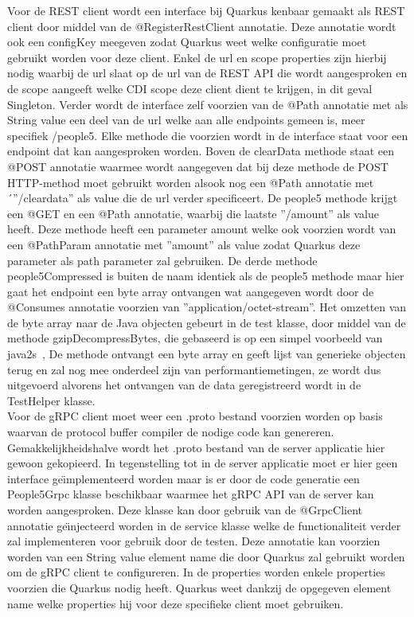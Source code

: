 Voor de REST client wordt een interface bij Quarkus kenbaar gemaakt als REST client door middel van de @RegisterRestClient annotatie. Deze annotatie wordt ook een configKey meegeven
zodat Quarkus weet welke configuratie moet gebruikt worden voor deze client.  Enkel de url en scope properties zijn hierbij nodig waarbij de url slaat op de url van de
REST API die wordt aangesproken en de scope aangeeft welke CDI scope deze client dient te krijgen, in dit geval Singleton.
Verder wordt de interface zelf voorzien van de @Path annotatie met als String value een deel van de url welke
aan alle endpoints gemeen is, meer specifiek /people5. Elke methode die voorzien wordt in de interface staat voor een endpoint dat kan aangesproken worden.
Boven de clearData methode staat een @POST annotatie waarmee wordt aangegeven dat bij deze methode de POST HTTP-method moet gebruikt worden alsook
nog een @Path annotatie met ´''/cleardata'' als value die de url verder specificeert. De people5 methode krijgt een @GET en een @Path annotatie, waarbij die laatste ''/{amount}''
als value heeft. Deze methode heeft een parameter amount welke ook voorzien wordt van een @PathParam annotatie met ''amount'' als value zodat Quarkus
deze parameter als path parameter zal gebruiken. De derde methode people5Compressed is buiten de naam identiek als de people5 methode maar hier gaat het endpoint een
byte array ontvangen wat aangegeven wordt door de @Consumes annotatie voorzien van ''application/octet-stream''. Het omzetten van de byte array naar de Java objecten gebeurt
in de test klasse, door middel van de methode gzipDecompressBytes, die gebaseerd is op een simpel voorbeeld van java2s~\parencite{gzipDecompressie},
De methode ontvangt een byte array en geeft lijst van generieke objecten terug en zal nog mee onderdeel zijn van performantiemetingen,
ze wordt dus uitgevoerd alvorens het ontvangen van de data geregistreerd wordt in de TestHelper klasse.
~\autocite{quarkusRESTclient}\\

Voor de gRPC client moet weer een .proto bestand voorzien worden op basis waarvan de protocol buffer compiler de nodige code kan genereren. Gemakkelijkheidshalve wordt het
.proto bestand van de server applicatie hier gewoon gekopieerd. In tegenstelling tot in de server applicatie moet er hier geen interface ge\"{\i}mplementeerd worden maar
is er door de code generatie een People5Grpc klasse beschikbaar waarmee het gRPC API van de server kan worden aangesproken. Deze klasse kan door gebruik van de
@GrpcClient annotatie ge\"{\i}njecteerd worden in de service klasse welke de functionaliteit verder zal implementeren voor gebruik door de testen. Deze annotatie
kan voorzien worden van een String value element name die door Quarkus zal gebruikt worden om de gRPC client te configureren. In de properties worden enkele properties voorzien
die Quarkus nodig heeft. Quarkus weet dankzij de opgegeven element name welke properties hij voor deze specifieke client moet gebruiken.\newline

